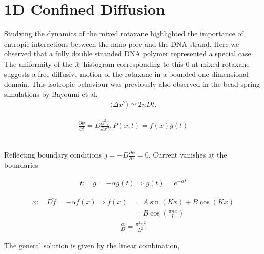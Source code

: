 \chapter{1D Confined Diffusion}

Studying the dynamics of the mixed rotaxane highlighted the importance of entropic
interactions between the nano pore and the DNA strand. Here we observed that a fully
double stranded DNA polymer represented a special case. The uniformity of the
$\mathcal{X}$ histogram corresponding to this 0 nt mixed rotaxane suggests a free
diffusive motion of the rotaxane in a bounded one-dimensional domain. This isotropic
behaviour was previously also observed in the bead-spring simulations by Bayoumi et
al. \cite{EntropicPiston}\\

\begin{align*}
  \langle \Delta x^2 \rangle \simeq 2n Dt.
\end{align*}


\begin{align*}
  \frac{\partial \psi}{\partial t} =  D \frac{\partial^2 \psi}{\partial x^2}, P(x,t) =
f(x)g(t)
\end{align*}

\begin{align*}
\end{align*}

Reflecting boundary conditions $j = - D \frac{\partial \psi}{\partial x} = 0$. Current
vanishes at the boundaries

\begin{align*}
t:\quad \dot{g} = - \alpha g(t) \Rightarrow g(t) = e^{-\alpha t}
\end{align*}

\begin{align*}
  x:\quad D \ddot{f} = - \alpha f(x) \Rightarrow f(x) &= A \sin(K x) + B \cos(Kx)\\
  &= B \cos(\frac{\pi n x}{L})
\end{align*}
\begin{align*}
  \frac{\alpha}{D} = \frac{\pi^2 n^2}{L^2}
\end{align*}

The general solution is given by the linear combination,

